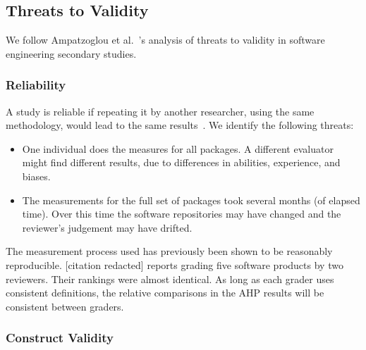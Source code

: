 \documentclass[final, 12pt, 3p, times]{elsarticle}
\begin{document}
\subsection{Threats to Validity} \label{sec_threats_to_validity}

We follow Ampatzoglou et al.\ \cite{AmpatzoglouEtAl2019}'s analysis of
threats to validity in software engineering secondary studies.

\subsubsection{Reliability}

A study is reliable if repeating it by another researcher, using the same
methodology, would lead to the same results~\cite{RunesonAndHost2009}.
We identify the following threats:

\begin{itemize}
\item One individual does the measures for all packages. A different
evaluator might find different results, due to differences in abilities,
experience, and biases.
\item The measurements for the full set of packages took several months (of
elapsed time).  Over this time the software repositories may have changed and
the reviewer's judgement may have drifted.
\end{itemize}

The measurement process used has previously been shown to be reasonably
reproducible.  [citation redacted] 
reports grading five software
products by two reviewers. Their rankings were almost identical. As long as each
grader uses consistent definitions, the relative comparisons in the AHP results
will be consistent between graders.

\subsubsection{Construct Validity}
\end{document}
